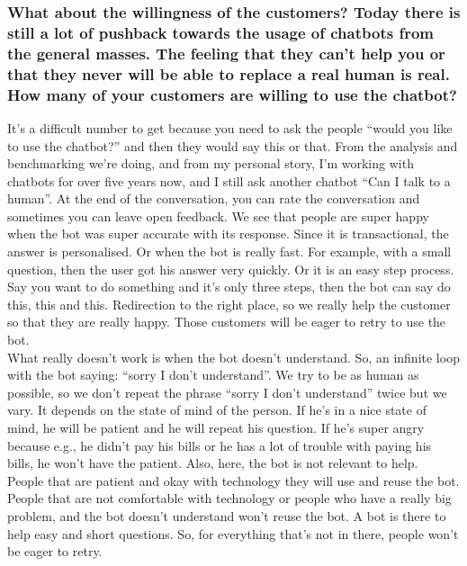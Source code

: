 \begin{appendices}
	\subsubsection{What about the willingness of the customers? Today there is still a lot of pushback towards the usage of chatbots from the general masses. The feeling that they can’t help you or that they never will be able to replace a real human is real. How many of your customers are willing to use the chatbot?}
	It’s a difficult number to get because you need to ask the people “would you like to use the chatbot?” and then they would say this or that. From the analysis and benchmarking we’re doing, and from my personal story, I’m working with chatbots for over five years now, and I still ask another chatbot “Can I talk to a human”. At the end of the conversation, you can rate the conversation and sometimes you can leave open feedback. We see that people are super happy when the bot was super accurate with its response. Since it is transactional, the answer is personalised. Or when the bot is really fast. For example, with a small question, then the user got his answer very quickly. Or it is an easy step process. Say you want to do something and it’s only three steps, then the bot can say do this, this and this. Redirection to the right place, so we really help the customer so that they are really happy. Those customers will be eager to retry to use the bot.\\
	\break
	What really doesn’t work is when the bot doesn’t understand. So, an infinite loop with the bot saying: “sorry I don’t understand”. We try to be as human as possible, so we don’t repeat the phrase “sorry I don’t understand” twice but we vary. It depends on the state of mind of the person. If he’s in a nice state of mind, he will be patient and he will repeat his question. If he’s super angry because e.g., he didn’t pay his bills or he has a lot of trouble with paying his bills, he won’t have the patient. Also, here, the bot is not relevant to help.\\
	\break
	People that are patient and okay with technology they will use and reuse the bot. People that are not comfortable with technology or people who have a really big problem, and the bot doesn’t understand won’t reuse the bot. A bot is there to help easy and short questions. So, for everything that’s not in there, people won’t be eager to retry.
	

\end{appendices}
